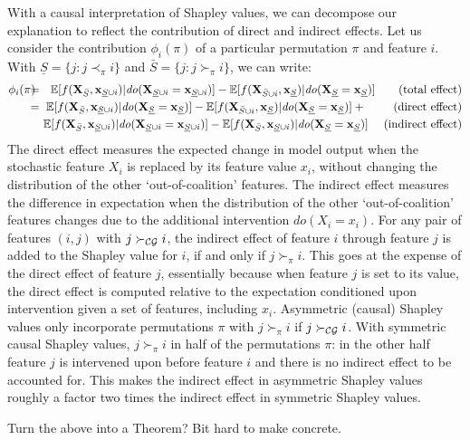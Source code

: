 \documentclass{article}
\newcommand{\vX}{\mathbf{X}}
\newcommand{\vx}{\mathbf{x}}
\newcommand{\expectation}{\mathbb{E}}
\newcommand{\contribution}{{\phi}}
\newcommand{\val}{{v}}
\newcommand{\dodo}{\mathit{do}}
\newcommand{\ldo}[1]{\dodo(X_{#1} = x_{#1})}
\newcommand{\lvdo}[1]{\dodo(\vX_{#1} = \vx_{#1})}
\newcommand{\perm}{\pi}
\newcommand{\isequal}{\hspace*{-2.5mm} & = & \hspace*{-2.5mm}}
\newcommand{\Spre}{\underline{S}}
\newcommand{\Spost}{\bar{S}}
\newcommand{\comment}[1]{{\color{red} #1}}
\begin{document}
With a causal interpretation of Shapley values, we can decompose our explanation to reflect the contribution of direct and indirect effects. Let us consider the contribution $\contribution_i(\perm)$ of a particular permutation $\perm$ and feature $i$. With $\Spre = \{j: j \prec_\perm i\}$ and $\Spost = \{j: j \succ_\perm i\}$, we can write:
\begin{eqnarray*}
\contribution_i(\perm) \isequal
\expectation[f(\vX_{\Spost},\vx_{\Spre \cup i})|\lvdo{\Spre \cup i}] - \expectation[f(\vX_{\Spost \cup i},\vx_{\Spre})|\lvdo{\Spre}] ~~~~~~\mbox{(total effect)} \\
\isequal \expectation[f(\vX_{\Spost},\vx_{\Spre \cup i})|\lvdo{\Spre}] - \expectation[f(\vX_{\Spost \cup i},\vx_{\Spre})|\lvdo{\Spre}] + ~~~~~~~\mbox{(direct effect)} \\
&& \! \! \! \! \expectation[f(\vX_{\Spost},\vx_{\Spre \cup i})|\lvdo{\Spre \cup i}] - \expectation[f(\vX_{\Spost},\vx_{\Spre \cup i})|\lvdo{\Spre}] ~~~~\mbox{(indirect effect)}
\end{eqnarray*}
The direct effect measures the expected change in model output when the stochastic feature $X_i$ is replaced by its feature value $x_i$, without changing the distribution of the other `out-of-coalition' features. The indirect effect measures the difference in expectation when the distribution of the other `out-of-coalition' features changes due to the additional intervention $\ldo{i}$. For any pair of features $(i,j)$ with $j \succ_{\cal CG} i$, the indirect effect of feature $i$ through feature $j$ is added to the Shapley value for $i$, if and only if $j \succ_\perm i$. This goes at the expense of the direct effect of feature $j$, essentially because when feature $j$ is set to its value, the direct effect is computed relative to the expectation conditioned upon intervention given a set of features, including $x_i$. Asymmetric (causal) Shapley values only incorporate permutations $\perm$ with $j \succ_\perm i$ if $j \succ_{\cal CG} i$. With symmetric causal Shapley values, $j \succ_\perm i$ in half of the permutations $\perm$: in the other half feature $j$ is intervened upon before feature $i$ and there is no indirect effect to be accounted for. This makes the indirect effect in asymmetric Shapley values roughly a factor two times the indirect effect in symmetric Shapley values.


\comment{Turn the above into a Theorem? Bit hard to make concrete.}
\end{document}
